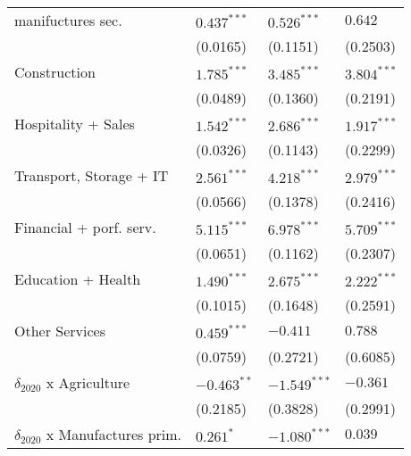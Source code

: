 \begin{table}[h!]
{{\begin{tabular}{llll}
manifuctures sec.                                  &      $0.437^{***}$ &      $0.526^{***}$ &            $0.642$ \\
                                                   &           (0.0165) &           (0.1151) &           (0.2503) \\
Construction                                       &      $1.785^{***}$ &      $3.485^{***}$ &      $3.804^{***}$ \\
                                                   &           (0.0489) &           (0.1360) &           (0.2191) \\
Hospitality + Sales                                &      $1.542^{***}$ &      $2.686^{***}$ &      $1.917^{***}$ \\
                                                   &           (0.0326) &           (0.1143) &           (0.2299) \\
Transport, Storage + IT                            &      $2.561^{***}$ &      $4.218^{***}$ &      $2.979^{***}$ \\
                                                   &           (0.0566) &           (0.1378) &           (0.2416) \\
Financial + porf. serv.                            &      $5.115^{***}$ &      $6.978^{***}$ &      $5.709^{***}$ \\
                                                   &           (0.0651) &           (0.1162) &           (0.2307) \\
Education + Health                                 &      $1.490^{***}$ &      $2.675^{***}$ &      $2.222^{***}$ \\
                                                   &           (0.1015) &           (0.1648) &           (0.2591) \\
Other Services                                     &      $0.459^{***}$ &           $-0.411$ &            $0.788$ \\
                                                   &           (0.0759) &           (0.2721) &           (0.6085) \\
$\delta_{2020}$ x Agriculture                      &      $-0.463^{**}$ &     $-1.549^{***}$ &           $-0.361$ \\
                                                   &           (0.2185) &           (0.3828) &           (0.2991) \\
$\delta_{2020}$ x Manufactures prim.               &          $0.261^*$ &     $-1.080^{***}$ &            $0.039$ \\

\end{tabular}}}
\end{table}
